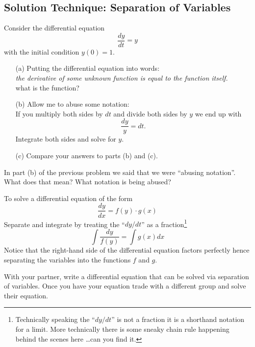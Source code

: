 \subsection{Solution Technique: Separation of Variables}
\begin{problem}
    Consider the differential equation 
    \[ \frac{dy}{dt} = y \]
    with the initial condition $y(0) = 1$.
    \begin{enumerate}
        \item[(a)] Putting the differential equation into words: \\ {\it the derivative of
            some unknown function is equal to the function itself.} \\
            what is the function?
        \item[(b)] Allow me to abuse some notation: \\
            If you multiply both sides by $dt$ and divide both sides by $y$ we end up with
            \[ \frac{dy}{y} = dt. \]
            Integrate both sides and solve for $y$.
        \item[(c)] Compare your answers to parts (b) and (c).
    \end{enumerate}
\end{problem}

\begin{problem}
    In part (b) of the previous problem we said that we were ``abusing notation''.  What does
    that mean?  What notation is being abused?
\end{problem}

\begin{technique}
    To solve a differential equation of the form
    \[ \frac{dy}{dx} = f(y)\cdot g(x) \]
    Separate and integrate by treating the ``$dy/dt$'' as a fraction\footnote{Technically
        speaking the ``$dy/dt$'' is not a fraction it is a shorthand notation for a
    limit.  More technically there is some sneaky chain rule happening behind the scenes
here \ldots can you find it.}
    \[ \int \frac{dy}{f(y)} = \int g(x) dx \]
    Notice that the right-hand side of the differential equation factors perfectly hence
    separating the variables into the functions $f$ and $g$.
\end{technique}

\begin{problem}
    With your partner, write a differential equation that can be solved via separation of
    variables.  Once you have your equation trade with a different group and solve their
    equation.
\end{problem}

